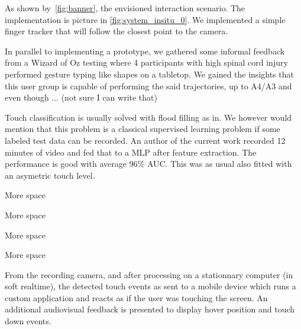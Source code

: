 \documentclass{chi-ext}
\begin{document}
As shown by~\autoref{fig:banner}, the envisioned interaction scenario. The implementation is picture in \autoref{fig:system_insitu_0}. We implemented a simple finger tracker that will follow the closest point to the camera.

In parallel to implementing a prototype, we gathered some informal feedback from a Wizard of Oz testing where 4 participants with high spinal cord injury performed gesture typing like shapes on a tabletop. We gained the insights that this user group is capable of performing the said trajectories, up to A4/A3 and even though ... (not sure I can write that)

Touch classification is usually solved with flood filling as in. We however would mention that this problem is a classical supervised learning problem if some labeled test data can be recorded. An author of the current work recorded 12 minutes of video and fed that to a MLP after feature extraction. The performance is good with average 96\% AUC. This was as usual also fitted with an asymetric touch level.

More space

More space

More space

More space



From the recording camera, and after processing on a stationnary computer (in soft realtime), the detected touch events as sent to a mobile device which runs a custom application and reacts as if the user was touching the screen. An additional audiovisual feedback is presented to display hover position and touch down events.
\end{document}
